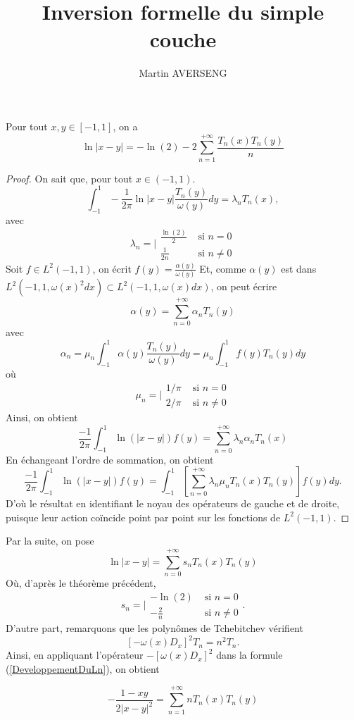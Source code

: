 \documentclass[11pt,a4paper]{article}
\author{Martin AVERSENG}
\title{Inversion formelle du simple couche}
\begin{document}
	\begin{The*}
		Pour tout $x,y \in [-1,1]$, on a
		\begin{equation}
			\ln |x-y| =  -\ln(2)  - 2\sum_{n=1}^{+\infty} \frac{T_n(x)T_n(y)}{n}
			\label{DeveloppementDuLn}
		\end{equation}
		\begin{proof}
			On sait que, pour tout $x \in (-1,1)$.
			\begin{equation}
				\int_{-1}^{1} -\frac{1}{2\pi}\ln|x-y| \frac{T_n(y)}{\omega(y)}dy = \lambda_n T_n(x),
			\end{equation}
			avec
			\begin{equation}
			\lambda_n = \Bigg|\begin{array}{lr}
			\frac{\ln(2)}{2} & \text{ si } n = 0\\
			\frac{1}{2n} & \text{ si } n \neq 0
			\end{array}
			\end{equation}
			Soit $f \in L^2(-1,1)$, on écrit $f(y) = \frac{\alpha(y)}{\omega(y)}$
			Et, comme $\alpha(y)$ est dans $L^2(-1,1,\omega(x)^2dx) \subset L^2(-1,1,\omega(x)dx)$, on peut écrire 
			\[\alpha(y) = \sum_{n=0}^{+\infty} \alpha_n T_n(y)\]
			avec 
			\[\alpha_n = \mu_n\int_{-1}^{1} \alpha(y) \frac{T_n(y)}{\omega(y)}dy = \mu_n\int_{-1}^1{f(y) T_n(y)dy}\]
			où \begin{equation}
			\mu_n = \Bigg|\begin{array}{lr}
			1/\pi& \text{ si } n = 0\\
			2/\pi & \text{ si } n \neq 0
			\end{array}
			\end{equation}
			Ainsi, on obtient 
			\[ \frac{-1}{2\pi}\int_{-1}^{1} \ln(|x-y|) f(y) = \sum_{n = 0}^{+ \infty} \lambda_n \alpha_n T_n(x)\]
			En échangeant l'ordre de sommation, on obtient
			\[ \frac{-1}{2\pi}\int_{-1}^{1} \ln(|x-y|) f(y) = \int_{-1}^{1} \left[\sum_{n = 0}^{+ \infty} \lambda_n \mu_n T_n(x)T_n(y)\right] f(y) dy.\]
			D'où le résultat en identifiant le noyau des opérateurs de gauche et de droite, puisque leur action coïncide point par point sur les fonctions de $L^2(-1,1)$. 
		\end{proof}
	\end{The*}
	Par la suite, on pose 
	\[\ln |x-y| = \sum_{n=0}^{+\infty}s_n T_n(x)T_n(y)\]
	Où, d'après le théorème précédent, 
	$$s_n = \Bigg|\begin{array}{lr}
	- \ln(2) & \text{ si } n = 0\\
	- \frac{2}{n} & \text{ si } n \neq 0
	\end{array}.$$ 
	D'autre part, remarquons que les polynômes de Tchebitchev vérifient 
	\[\left[-\omega(x)D_x\right]^2 T_n = n^2 T_n.\]
	Ainsi, en appliquant l'opérateur $-\left[\omega(x)D_x\right]^2$ dans la formule (\ref{DeveloppementDuLn}), on obtient	
	\begin{Cor*}
		\[-\frac{1-xy}{2|x-y|^2} = \sum_{n=1}^{+\infty} n T_n(x)T_n(y)\]
	\end{Cor*}
	
\end{document}
